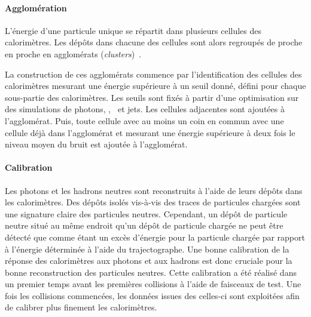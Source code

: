 \paragraph{Agglomération}
L'énergie d'une particule unique se répartit dans plusieurs cellules des calorimètres.
Les dépôts dans chacune des cellules sont alors regroupés de proche en proche en agglomérats (\emph{clusters})~\cite{particle-flow}.
\par La construction de ces agglomérats commence par l'identification des cellules des calorimètres mesurant une énergie supérieure à un seuil donné, défini pour chaque sous-partie des calorimètres.
Les seuils sont fixés à partir d'une optimisation sur des simulations de photons, \pionnull, \Kaonnull\ et jets.
Les cellules adjacentes sont ajoutées à l'agglomérat.
Puis, toute cellule avec au moins un coin en commun avec une cellule déjà dans l'agglomérat et mesurant une énergie supérieure à deux fois le niveau moyen du bruit est ajoutée à l'agglomérat.
\paragraph{Calibration}
Les photons et les hadrons neutres sont reconstruits à l'aide de leurs dépôts dans les calorimètres.
Des dépôts isolés vis-à-vis des traces de particules chargées sont une signature claire des particules neutres.
Cependant, un dépôt de particule neutre situé au même endroit qu'un dépôt de particule chargée ne peut être détecté que comme étant un excès d'énergie pour la particule chargée par rapport à l'énergie déterminée à l'aide du trajectographe.
Une bonne calibration de la réponse des calorimètres aux photons et aux hadrons est donc cruciale pour la bonne reconstruction des particules neutres.
Cette calibration a été réalisé dans un premier temps avant les premières collisions à l'aide de faisceaux de test.
Une fois les collisions commencées, les données issues des celles-ci sont exploitées afin de calibrer plus finement les calorimètres.

